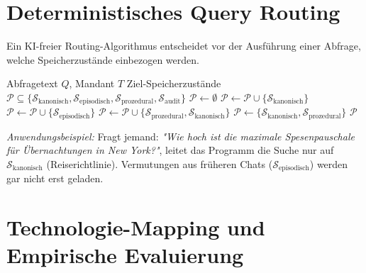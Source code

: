 \documentclass[10pt,journal,compsoc]{IEEEtran}
\begin{document}
\section{Deterministisches Query Routing}
\label{sec:routing}

Ein KI-freier Routing-Algorithmus entscheidet vor der Ausführung einer Abfrage, welche Speicherzustände einbezogen werden.

\begin{algorithm}[h]
\caption{Festgelegtes Query Routing Protocol}
\label{alg:router}
\begin{algorithmic}[1]
\REQUIRE Abfragetext $Q$, Mandant $T$
\ENSURE Ziel-Speicherzustände $\mathcal{P} \subseteq \{\mathcal{S}_{\text{kanonisch}}, \mathcal{S}_{\text{episodisch}}, \mathcal{S}_{\text{prozedural}}, \mathcal{S}_{\text{audit}}\}$
\STATE $\mathcal{P} \leftarrow \emptyset$
    \STATE $\mathcal{P} \leftarrow \mathcal{P} \cup \{\mathcal{S}_{\text{kanonisch}}\}$
    \STATE $\mathcal{P} \leftarrow \mathcal{P} \cup \{\mathcal{S}_{\text{episodisch}}\}$
    \STATE $\mathcal{P} \leftarrow \mathcal{P} \cup \{\mathcal{S}_{\text{prozedural}}, \mathcal{S}_{\text{kanonisch}}\}$
\ELSE
    \STATE $\mathcal{P} \leftarrow \{\mathcal{S}_{\text{kanonisch}}, \mathcal{S}_{\text{prozedural}}\}$ 
\ENDIF
\RETURN $\mathcal{P}$
\end{algorithmic}
\end{algorithm}

\emph{Anwendungsbeispiel:} Fragt jemand: \emph{"Wie hoch ist die maximale Spesenpauschale für Übernachtungen in New York?"}, leitet das Programm die Suche nur auf $\mathcal{S}_{\text{kanonisch}}$ (Reiserichtlinie). Vermutungen aus früheren Chats ($\mathcal{S}_{\text{episodisch}}$) werden gar nicht erst geladen.

\section{Technologie-Mapping und Empirische Evaluierung}
\label{sec:evaluierung}
\end{document}
